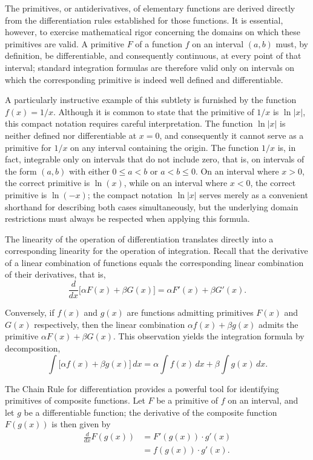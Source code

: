 The primitives, or antiderivatives, of elementary functions are derived directly from the differentiation rules established for those functions. It is essential, however, to exercise mathematical rigor concerning the domains on which these primitives are valid. A primitive $F$ of a function $f$ on an interval $(a,b)$ must, by definition, be differentiable, and consequently continuous, at every point of that interval; standard integration formulas are therefore valid only on intervals on which the corresponding primitive is indeed well defined and differentiable.

A particularly instructive example of this subtlety is furnished by the function $f(x) = 1/x$. Although it is common to state that the primitive of $1/x$ is $\ln|x|$, this compact notation requires careful interpretation. The function $\ln|x|$ is neither defined nor differentiable at $x=0$, and consequently it cannot serve as a primitive for $1/x$ on any interval containing the origin. The function $1/x$ is, in fact, integrable only on intervals that do not include zero, that is, on intervals of the form $(a,b)$ with either $0 \leq a < b$ or $a < b \leq 0$. On an interval where $x > 0$, the correct primitive is $\ln(x)$, while on an interval where $x < 0$, the correct primitive is $\ln(-x)$; the compact notation $\ln|x|$ serves merely as a convenient shorthand for describing both cases simultaneously, but the underlying domain restrictions must always be respected when applying this formula.


The linearity of the operation of differentiation translates directly into a corresponding linearity for the operation of integration. Recall that the derivative of a linear combination of functions equals the corresponding linear combination of their derivatives, that is,
\[
\frac{d}{dx} \big[ \alpha F(x) + \beta G(x) \big] = \alpha F'(x) + \beta G'(x).
\]

Conversely, if $f(x)$ and $g(x)$ are functions admitting primitives $F(x)$ and $G(x)$ respectively, then the linear combination $\alpha f(x) + \beta g(x)$ admits the primitive $\alpha F(x) + \beta G(x)$. This observation yields the integration formula by decomposition,
\[
\int \big[ \alpha f(x) + \beta g(x) \big] \, dx = \alpha \int f(x) \, dx + \beta \int g(x) \, dx.
\]


The Chain Rule for differentiation provides a powerful tool for identifying primitives of composite functions. Let $F$ be a primitive of $f$ on an interval, and let $g$ be a differentiable function; the derivative of the composite function $F(g(x))$ is then given by
\[
\begin{aligned}
\frac{d}{dx} F(g(x)) &= F'(g(x)) \cdot g'(x) \\
&= f(g(x)) \cdot g'(x).
\end{aligned}
\]


